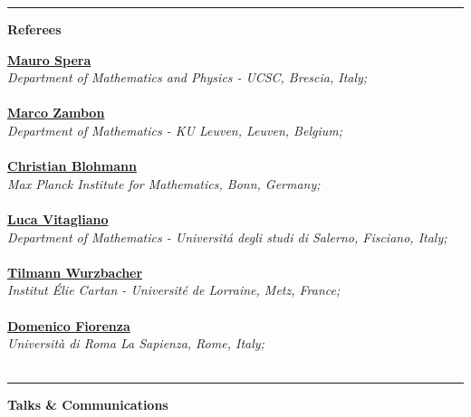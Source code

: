 \documentclass[a4paper]{article}
\newcommand{\block}[1]{\hrule \vspace{0.2cm} \textbf{\Large #1} \vspace{0.2cm}}
\newcommand{\voice}[5]{\href{#4}{\textbf{#1}} \hfill #2 \\ \textit{#3} \\ {\small #5} \vspace{0.2cm} \\}
\begin{document}


    \block{Referees}

    
    \voice{Mauro Spera}
        {}
        {Department of Mathematics and Physics - UCSC, Brescia, Italy;}
        {http://docenti.unicatt.it/ita/mauro_spera/}       
        {\vspace{-0.5cm}}
    \voice{Marco Zambon}
        {}
        {Department of Mathematics - KU Leuven, Leuven, Belgium;}
        {https://perswww.kuleuven.be/~u0096206/}       
        {\vspace{-0.5cm}}
    \voice{Christian Blohmann}
        {}
        {Max Planck Institute for Mathematics, Bonn, Germany;}
        {http://people.mpim-bonn.mpg.de/blohmann/}       
        {\vspace{-0.5cm}}
    \voice{Luca Vitagliano}
        {}
        {Department of Mathematics - Universit\'a degli studi di Salerno, Fisciano, Italy;}
        {http://www.dipmat2.unisa.it/people/vitagliano/www/}       
        {\vspace{-0.5cm}}
    \voice{Tilmann Wurzbacher}
        {}
        {Institut \'Elie Cartan - Universit\'e de Lorraine, Metz, France;}
        {https://iecl.univ-lorraine.fr/membre-iecl/wurzbacher-tilmann/}       
        {\vspace{-0.5cm}}
    \voice{Domenico Fiorenza}
        {}
        {Università di Roma La Sapienza, Rome, Italy;}
        {https://www1.mat.uniroma1.it/~fiorenza/}       
        {\vspace{-0.5cm}}





    \block{Talks \& Communications}
\end{document}
